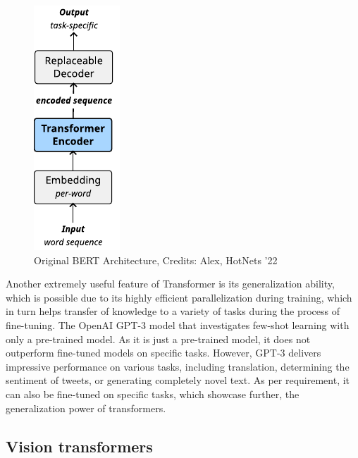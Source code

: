 \begin{figure}[!hbt]
  \begin{center}
    \includegraphics[scale=1.5]{figures/architecture_bert.pdf}
    \caption{Original BERT Architecture, Credits: Alex, HotNets '22}
    \label{fig:bert}
  \end{center}
\end{figure}



Another extremely useful feature of Transformer is its generalization ability, which is  possible due to its highly efficient parallelization during training, which in turn helps transfer of knowledge to a variety of tasks during the process of fine-tuning. The OpenAI GPT-3\cite{brownLanguageModelsAre2020} model that investigates few-shot learning with only a pre-trained model.
As it is just a pre-trained model, it does not outperform fine-tuned models on specific tasks. However, GPT-3 delivers impressive performance on various tasks, including translation, determining the sentiment of tweets, or generating completely novel text. As per requirement, it can also be fine-tuned on specific tasks, which showcase further, the generalization power of transformers.


\subsection{Vision transformers}

